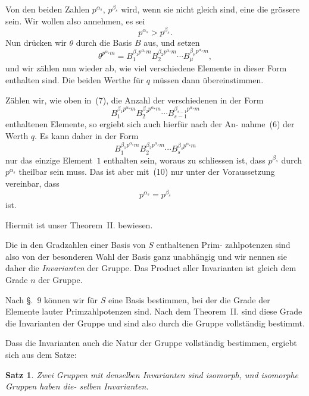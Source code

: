 \documentclass[12pt,a4paper]{article}
\theoremstyle{plain}
\newtheorem{satz}{Satz}[section]
\theoremstyle{definition}
\theoremstyle{remark}
\begin{document}
Von den beiden Zahlen $p^{\alpha_s}$, $p^{\beta_s}$ wird, wenn sie nicht gleich
sind, eine die grössere sein. Wir wollen also annehmen, es sei
\begin{equation}\tag{10}
p^{\alpha_s} > p^{\beta_s}.
\end{equation}
Nun drücken wir $\theta$ durch die Basis $B$ aus, und setzen
\begin{equation}\tag{11}
\theta^{p^{\alpha_s} m} = B_1^{\beta_1 p^{\alpha_s} m} B_2^{\beta_2 p^{\alpha_s} m} \cdots B_\mu^{\beta_\mu p^{\alpha_s} m},
\end{equation}
und wir zählen nun wieder ab, wie viel verschiedene Elemente
in dieser Form enthalten sind. Die beiden Werthe für $q$ müssen
dann übereinstimmen.

Zählen wir, wie oben in~(7), die Anzahl der verschiedenen
in der Form
\begin{equation}\tag{12}
B_1^{\beta_1 p^{\alpha_s} m} B_2^{\beta_2 p^{\alpha_s} m} \cdots B_{s-1}^{\beta_{s-1} p^{\alpha_s} m}
\end{equation}
enthaltenen Elemente, so ergiebt sich auch hierfür nach der An-
nahme~(6) der Werth $q$. Es kann daher in der Form
\begin{equation}\tag{13}
B_1^{\beta_1 p^{\alpha_s} m} B_2^{\beta_2 p^{\alpha_s} m} \cdots B_s^{\beta_s p^{\alpha_s} m}
\end{equation}
nur das einzige Element~$1$ enthalten sein, woraus zu schliessen
ist, dass $p^{\beta_s}$ durch $p^{\alpha_s}$ theilbar sein muss. Das ist aber mit~(10)
nur unter der Voraussetzung vereinbar, dass
\begin{equation}\tag{14}
p^{\alpha_s} = p^{\beta_s}
\end{equation}
ist.

Hiermit ist unser Theorem~II. bewiesen.

Die in den Gradzahlen einer Basis von $S$ enthaltenen Prim-
zahlpotenzen sind also von der besonderen Wahl der Basis ganz
unabhängig und wir nennen sie daher die \emph{Invarianten} der
Gruppe. Das Product aller Invarianten ist gleich dem Grade $n$
der Gruppe.

Nach \S.~9 können wir für $S$ eine Basis bestimmen, bei der
die Grade der Elemente lauter Primzahlpotenzen sind. Nach
dem Theorem~II. sind diese Grade die Invarianten der Gruppe
und sind also durch die Gruppe vollständig bestimmt.

Dass die Invarianten auch die Natur der Gruppe vollständig
bestimmen, ergiebt sich aus dem Satze:

\begin{satz} %
Zwei Gruppen mit denselben Invarianten sind
isomorph, und isomorphe Gruppen haben die-
selben Invarianten.
\end{satz}
\end{document}
